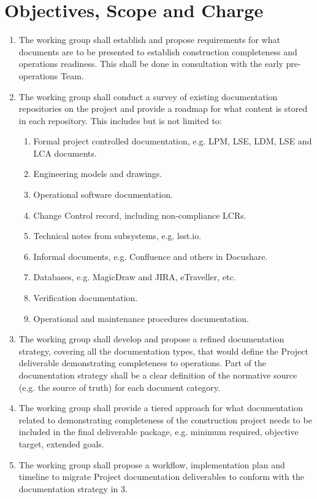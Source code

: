 \documentclass[SE,authoryear,toc]{lsstdoc}
\begin{document}
\section{Objectives, Scope and Charge}
\begin{enumerate}
\item The working group shall establish and propose requirements for what documents are to be presented to establish construction completeness and operations readiness.  This shall be done in consultation with the early pre-operations Team.
\item  The working group shall conduct a survey of existing documentation repositories on the project and provide a roadmap for what content is stored in each repository.  This includes but is not limited to:
	\begin{enumerate}
    		\item Formal project controlled documentation, e.g. LPM, LSE, LDM, LSE and LCA documents.
    		\item Engineering models and drawings.
    		\item Operational software documentation.
   		\item Change Control record, including non-compliance LCRs.
    		\item Technical notes from subsystems, e.g. lsst.io.
    		\item Informal documents, e.g. Confluence and others in Docushare.
    		\item Databases, e.g. MagicDraw and JIRA, eTraveller, etc. 
    		\item Verification documentation.
    		\item Operational and maintenance procedures documentation.
	\end{enumerate} 
\item {The working group shall develop and propose a refined documentation strategy, covering all the documentation types, that would define the Project deliverable demonstrating completeness to operations.
Part of the documentation strategy shall be a clear definition of the normative source (e.g. the source of truth) for each document category.}
\item {The working group shall provide a tiered approach for what documentation related to demonstrating completeness of the construction project needs to be included in the final deliverable package, e.g. minimum required, objective target, extended goals.}
\item{The working group shall propose a workflow, implementation plan and timeline to migrate Project documentation deliverables to conform with the documentation strategy in 3. 
}
\end{enumerate}
\end{document}
